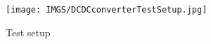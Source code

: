 \begin{figure}[H]
	\centering
	\texttt{[image: IMGS/DCDCconverterTestSetup.jpg]}
	\caption{Test setup}
	\label{fig:arch}
\end{figure} 
